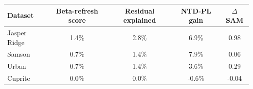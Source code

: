 \begin{tabular}{@{}l c c c c@{}}
\toprule
Dataset & Beta-refresh score & Residual explained & NTD-PL gain & \(\Delta\)SAM \\
\midrule
Jasper Ridge & 1.4\% & 2.8\% & 6.9\% & 0.98\\
Samson & 0.7\% & 1.4\% & 7.9\% & 0.06\\
Urban & 0.7\% & 1.4\% & 3.6\% & 0.29\\
Cuprite & 0.0\% & 0.0\% & -0.6\% & -0.04\\
\bottomrule
\end{tabular}
